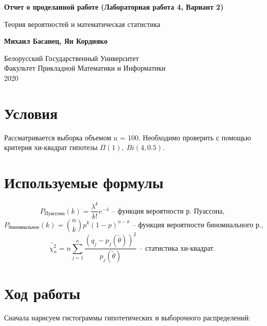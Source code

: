 \documentclass[12pt]{article}
\begin{document}
\begin{titlepage}
    \begin{center}
        \vspace*{8cm}
 
        \textbf{Отчет о проделанной работе (Лабораторная работа 4, Вариант 2)}
 
        \vspace{0.5cm}
            Теория вероятностей и математическая статистика
             
        \vspace{1.5cm}
 
        \textbf{Михаил Басанец, Ян Кордияко}
 
        \vfill
             
             
        \vspace{0.8cm}
      
        Белорусский Государственный Университет \\
        Факультет Прикладной Математики и Информатики\\
        2020
             
    \end{center}
\end{titlepage}

\section{Условия}

Рассматривается выборка объемом n = 100. Необходимо 
проверить с помощью критерия хи-квадрат гипотезы $\Pi(1), \  Bi(4, 0.5)$.
\section{Используемые формулы}
\begin{equation}
    \label{eq:1}
    P_{\text{Пуассона}}(k) = \frac{\lambda^k}{k!}e^{-\lambda} \text{ -- функция вероятности р. Пуассона,}
\end{equation}
\begin{equation}
    \label{eq:2}
    P_{\text{биномиальное}}(k) = {{n}\choose{k}}p^k(1 - p)^{n - k} \text{ -- функция вероятности биномиального р.,}
\end{equation}
\begin{equation}
    \label{eq:3}
    \widetilde{\chi^2_n} = n\sum_{j=1}^n\frac{(q_j - p_j(\widetilde{\theta}))^2}{p_j(\widetilde{\theta})} \text{ -- статистика хи-квадрат.}
\end{equation}
\section{Ход работы}
Сначала нарисуем гистограммы гипотетических и выборочного распределений:
\end{document}
